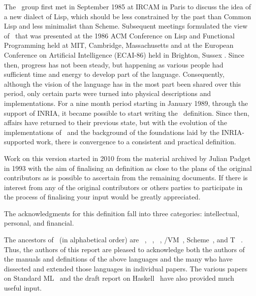 \begin{foreword}
\label{history}
\begin{optDefinition}
The \eulisp\ group first met in September 1985 at IRCAM in Paris to discuss the
idea of a new dialect of Lisp, which should be less constrained by the past than
Common Lisp and less minimalist than Scheme.  Subsequent meetings formulated the
view of \eulisp\ that was presented at the 1986 ACM Conference on Lisp and
Functional Programming held at MIT, Cambridge, Massachusetts 
and at the European Conference on Artificial Intelligence (ECAI-86) held in
Brighton, Sussex .  Since then, progress has not been steady, but
happening as various people had sufficient time and energy to develop part of
the language.  Consequently, although the vision of the language has in the most
part been shared over this period, only certain parts were turned into physical
descriptions and implementations.  For a nine month period starting in January
1989, through the support of INRIA, it became possible to start writing the
\eulisp\ definition.  Since then, affairs have returned to their previous state,
but with the evolution of the implementations of \eulisp\ and the background of
the foundations laid by the INRIA-supported work, there is convergence to a
consistent and practical definition.

Work on this version started in 2010 from the material archived by Julian Padget
in 1993 with the aim of finalising an  definition as close to the
plans of the original contributors as is possible to ascertain from the
remaining documents.  If there is interest from any of the original contributors
or others parties to participate in the process of finalising  your
input would be greatly appreciated.
\end{optDefinition}

\begin{optDefinition}
The acknowledgments for this definition fall into three categories:
intellectual, personal, and financial.

The ancestors of \eulisp\ (in alphabetical order) are
\cl{}~,
\interlisp{}~,
\lelisp{}~,
\lisp/VM~, Scheme~,
and T~ .  Thus, the authors of
this report are pleased to acknowledge both the authors of the manuals and
definitions of the above languages and the many who have dissected and extended
those languages in individual papers.  The various papers on Standard
ML~ and the draft report on
Haskell~ have also provided much useful
input.


\end{optDefinition}
\end{foreword}
